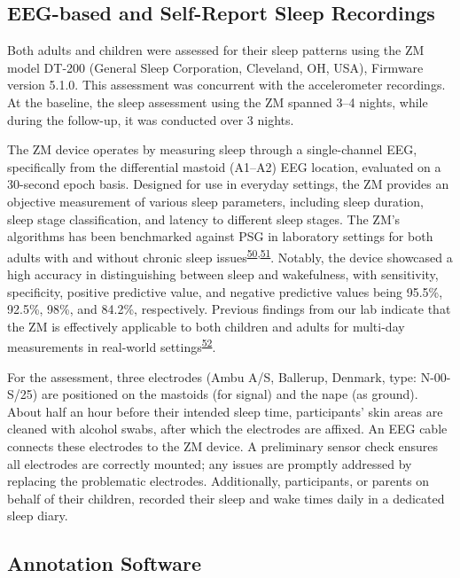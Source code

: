 \documentclass[
  10pt,
]{scrbook}
\begin{document}
\hypertarget{eeg-based-and-self-report-sleep-recordings}{%
\subsection{EEG-based and Self-Report Sleep
Recordings}\label{eeg-based-and-self-report-sleep-recordings}}

Both adults and children were assessed for their sleep patterns using
the ZM model DT-200 (General Sleep Corporation, Cleveland, OH, USA),
Firmware version 5.1.0. This assessment was concurrent with the
accelerometer recordings. At the baseline, the sleep assessment using
the ZM spanned 3--4 nights, while during the follow-up, it was conducted
over 3 nights.

The ZM device operates by measuring sleep through a single-channel EEG,
specifically from the differential mastoid (A1--A2) EEG location,
evaluated on a 30-second epoch basis. Designed for use in everyday
settings, the ZM provides an objective measurement of various sleep
parameters, including sleep duration, sleep stage classification, and
latency to different sleep stages. The ZM's algorithms has been
benchmarked against PSG in laboratory settings for both adults with and
without chronic sleep
issues\textsuperscript{\protect\hyperlink{ref-kaplan_performance_2014}{50},\protect\hyperlink{ref-wang_evaluation_2015}{51}}.
Notably, the device showcased a high accuracy in distinguishing between
sleep and wakefulness, with sensitivity, specificity, positive
predictive value, and negative predictive values being 95.5\%, 92.5\%,
98\%, and 84.2\%, respectively. Previous findings from our lab indicate
that the ZM is effectively applicable to both children and adults for
multi-day measurements in real-world
settings\textsuperscript{\protect\hyperlink{ref-pedersen_self-administered_2021}{52}}.

For the assessment, three electrodes (Ambu A/S, Ballerup, Denmark, type:
N-00-S/25) are positioned on the mastoids (for signal) and the nape (as
ground). About half an hour before their intended sleep time,
participants' skin areas are cleaned with alcohol swabs, after which the
electrodes are affixed. An EEG cable connects these electrodes to the ZM
device. A preliminary sensor check ensures all electrodes are correctly
mounted; any issues are promptly addressed by replacing the problematic
electrodes. Additionally, participants, or parents on behalf of their
children, recorded their sleep and wake times daily in a dedicated sleep
diary.

\hypertarget{annotation-software}{%
\subsection{Annotation Software}\label{annotation-software}}
\end{document}

